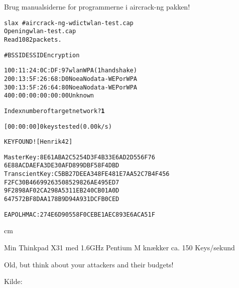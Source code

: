 \documentclass[Screen16to9,17pt]{foils}
\begin{document}
\centerline{Brug manualsiderne for programmerne i aircrack-ng pakken!}


\begin{alltt}
\small
slax ~ # aircrack-ng -w dict wlan-test.cap
Opening wlan-test.cap
Read 1082 packets.

#  BSSID              ESSID           Encryption

1  00:11:24:0C:DF:97  wlan            WPA (1 handshake)
2  00:13:5F:26:68:D0  Noea            No data - WEP or WPA
3  00:13:5F:26:64:80  Noea            No data - WEP or WPA
4  00:00:00:00:00:00                  Unknown

Index number of target network ? {\bf 1}
\end{alltt}


\begin{alltt}
\small
          [00:00:00] 0 keys tested (0.00 k/s)

                    KEY FOUND! [ Henrik42 ]

Master Key     : 8E 61 AB A2 C5 25 4D 3F 4B 33 E6 AD 2D 55 6F 76
                 6E 88 AC DA EF A3 DE 30 AF D8 99 DB F5 8F 4D BD
Transcient Key : C5 BB 27 DE EA 34 8F E4 81 E7 AA 52 C7 B4 F4 56
                 F2 FC 30 B4 66 99 26 35 08 52 98 26 AE 49 5E D7
                 9F 28 98 AF 02 CA 29 8A 53 11 EB 24 0C B0 1A 0D
                 64 75 72 BF 8D AA 17 8B 9D 94 A9 31 DC FB 0C ED

EAPOL HMAC     : 27 4E 6D 90 55 8F 0C EB E1 AE C8 93 E6 AC A5 1F

\end{alltt}

 cm

\centerline{Min Thinkpad X31 med 1.6GHz Pentium M knækker ca. 150 Keys/sekund}


Old, but think about your attackers and their budgets!

Kilde: 

\end{document}
